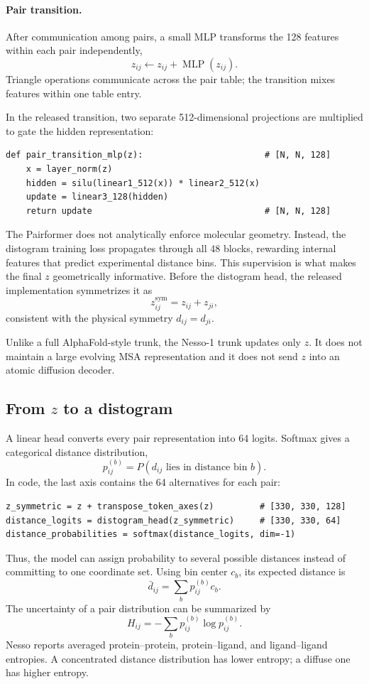 \documentclass[11pt]{article}
\begin{document}
\paragraph{Pair transition.}
After communication among pairs, a small MLP transforms the 128 features within
each pair independently,
\[
  z_{ij}\leftarrow z_{ij}+\operatorname{MLP}(z_{ij}).
\]
Triangle operations communicate across the pair table; the transition mixes
features within one table entry.

In the released transition, two separate 512-dimensional projections are
multiplied to gate the hidden representation:
\begin{verbatim}
def pair_transition_mlp(z):                        # [N, N, 128]
    x = layer_norm(z)
    hidden = silu(linear1_512(x)) * linear2_512(x)
    update = linear3_128(hidden)
    return update                                  # [N, N, 128]
\end{verbatim}

The Pairformer does not analytically enforce molecular geometry. Instead, the
distogram training loss propagates through all 48 blocks, rewarding internal
features that predict experimental distance bins. This supervision is what
makes the final $z$ geometrically informative. Before the distogram head, the
released implementation symmetrizes it as
\[
  z_{ij}^{\mathrm{sym}}=z_{ij}+z_{ji},
\]
consistent with the physical symmetry $d_{ij}=d_{ji}$.

Unlike a full AlphaFold-style trunk, the Nesso-1 trunk updates only $z$. It does
not maintain a large evolving MSA representation and it does not send $z$ into
an atomic diffusion decoder.

\subsection{From \texorpdfstring{$z$}{z} to a distogram}

A linear head converts every pair representation into 64 logits. Softmax gives
a categorical distance distribution,
\[
  p_{ij}^{(b)}=P\!\left(d_{ij}\text{ lies in distance bin }b\right).
\]
In code, the last axis contains the 64 alternatives for each pair:
\begin{verbatim}
z_symmetric = z + transpose_token_axes(z)         # [330, 330, 128]
distance_logits = distogram_head(z_symmetric)     # [330, 330, 64]
distance_probabilities = softmax(distance_logits, dim=-1)
\end{verbatim}
Thus, the model can assign probability to several possible distances instead
of committing to one coordinate set. Using bin center $c_b$, its expected
distance is
\[
  \bar d_{ij}=\sum_b p_{ij}^{(b)}c_b.
\]
The uncertainty of a pair distribution can be summarized by
\[
  H_{ij}=-\sum_b p_{ij}^{(b)}\log p_{ij}^{(b)}.
\]
Nesso reports averaged protein--protein, protein--ligand, and ligand--ligand
entropies. A concentrated distance distribution has lower entropy; a diffuse
one has higher entropy.
\end{document}
